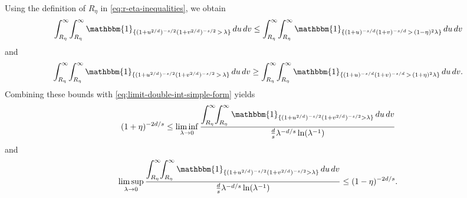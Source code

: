 \documentclass[a4paper,12pt]{article}
\let\originalleft\left
\let\originalright\right
\renewcommand{\left}{\mathopen{}\mathclose\bgroup\originalleft}
\renewcommand{\right}{\aftergroup\egroup\originalright}
\newcommand{\symbolnotsobw}{\symbolnot_{\mathcal{W}}}
\newcommand{\symbolnot}{\sigma}
\begin{document}

Using the definition of $R_\eta$ in \eqref{eq:r-eta-inequalities}, we obtain
\[
\int_{R_\eta}^{\infty}\!\int_{R_\eta}^{\infty}
\mathbbm{1}_{\{(1+u^{2/d})^{-s/2}(1+v^{2/d})^{-s/2}\,>\,\lambda\}}
\,du\,dv
\le
\int_{R_\eta}^{\infty}\!\int_{R_\eta}^{\infty}
\mathbbm{1}_{\{(1+u)^{-s/d}(1+v)^{-s/d}\,>\,(1-\eta)^2\lambda\}}
\,du\,dv
\]
and
\[
\int_{R_\eta}^{\infty}\!\int_{R_\eta}^{\infty}
\mathbbm{1}_{\{(1+u^{2/d})^{-s/2}(1+v^{2/d})^{-s/2}\,>\,\lambda\}}
\,du\,dv
\ge
\int_{R_\eta}^{\infty}\!\int_{R_\eta}^{\infty}
\mathbbm{1}_{\{(1+u)^{-s/d}(1+v)^{-s/d}\,>\,(1+\eta)^2\lambda\}}
\,du\,dv .
\]
Combining these bounds with \eqref{eq:limit-double-int-simple-form} yields
\[
(1+\eta)^{-2d/s}
\le
\liminf_{\lambda\to0}
\frac{
\displaystyle
\int_{R_\eta}^{\infty}\!\!\int_{R_\eta}^{\infty}
\mathbbm{1}_{\{(1+u^{2/d})^{-s/2}(1+v^{2/d})^{-s/2}>\lambda\}}
\,du\,dv
}{
\frac{d}{s}\lambda^{-d/s}\ln(\lambda^{-1})
}
\]
and
\[
\limsup_{\lambda\to0}
\frac{
\displaystyle
\int_{R_\eta}^{\infty}\!\!\int_{R_\eta}^{\infty}
\mathbbm{1}_{\{(1+u^{2/d})^{-s/2}(1+v^{2/d})^{-s/2}>\lambda\}}
\,du\,dv
}{
\frac{d}{s}\lambda^{-d/s}\ln(\lambda^{-1})
}
\le
(1-\eta)^{-2d/s}.
\]
\end{document}
